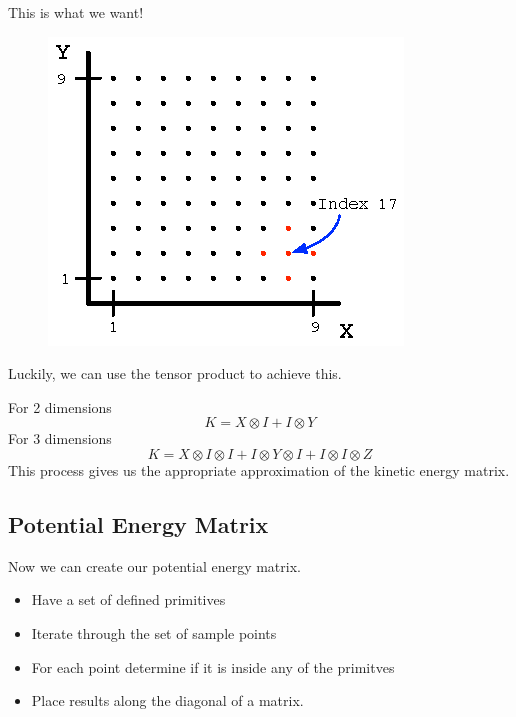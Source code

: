 \documentclass{beamer}
\begin{document}
\begin{frame}
This is what we want!
\begin{figure}
\centering
  \includegraphics[scale=1.2]{figures/finite2D.eps}
\label{fig:finite2D}
\end{figure}
\end{frame}

\begin{frame}
Luckily, we can use the tensor product to achieve this. 

For 2 dimensions
\begin{equation}
K = X \otimes I + I \otimes Y \nonumber
\end{equation}
For 3 dimensions
\begin{equation}
K = X \otimes I \otimes I + I \otimes Y \otimes I + I \otimes I \otimes Z \nonumber
\end{equation}
This process gives us the appropriate approximation of the kinetic energy matrix. 
\end{frame}

\subsection{Potential Energy Matrix}

\begin{frame}
Now we can create our potential energy matrix. 

\begin{itemize}
  \item Have a set of defined primitives
  \item Iterate through the set of sample points
  \item For each point determine if it is inside any of the primitves
  \item Place results along the diagonal of a matrix.
\end{itemize}
\end{frame}
\end{document}
